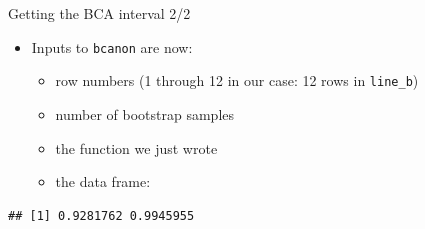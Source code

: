 \documentclass[
  ignorenonframetext,
]{beamer}
\newenvironment{Shaded}{\begin{snugshade}}{\end{snugshade}}
\newcommand{\DataTypeTok}[1]{\textcolor[rgb]{0.13,0.29,0.53}{#1}}
\newcommand{\DecValTok}[1]{\textcolor[rgb]{0.00,0.00,0.81}{#1}}
\newcommand{\FloatTok}[1]{\textcolor[rgb]{0.00,0.00,0.81}{#1}}
\newcommand{\KeywordTok}[1]{\textcolor[rgb]{0.13,0.29,0.53}{\textbf{#1}}}
\newcommand{\NormalTok}[1]{#1}
\newcommand{\OperatorTok}[1]{\textcolor[rgb]{0.81,0.36,0.00}{\textbf{#1}}}
\newcommand{\StringTok}[1]{\textcolor[rgb]{0.31,0.60,0.02}{#1}}
\providecommand{\tightlist}{%
  \setlength{\itemsep}{0pt}\setlength{\parskip}{0pt}}
\begin{document}
\begin{frame}[fragile]{Getting the BCA interval 2/2}
\protect\hypertarget{getting-the-bca-interval-22}{}

\begin{itemize}
\tightlist
\item
  Inputs to \texttt{bcanon} are now:

  \begin{itemize}
  \tightlist
  \item
    row numbers (1 through 12 in our case: 12 rows in \texttt{line\_b})
  \item
    number of bootstrap samples
  \item
    the function we just wrote
  \item
    the data frame:
  \end{itemize}
\end{itemize}

\begin{Shaded}
\end{Shaded}

\begin{verbatim}
## [1] 0.9281762 0.9945955
\end{verbatim}

\end{frame}
\end{document}
